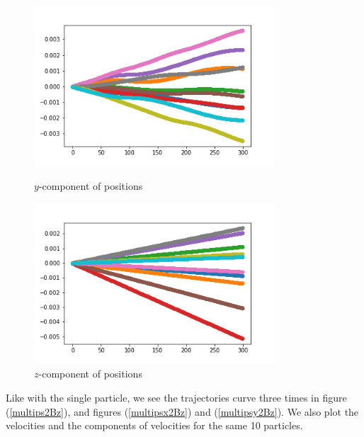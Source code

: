 \documentclass[12pt]{article}
\begin{document}
	\begin{figure}[H]
		\begin{multicols}{2}
			\includegraphics[width=\linewidth, height=6cm]{multipsy2Bz.png} \caption{$y$-component of positions} \label{multipsy2Bz} \par
			\includegraphics[width=\linewidth, height=6cm]{multipsz2Bz.png} \caption{$z$-component of positions} \label{multipsz2Bz} \par
		\end{multicols}
	\end{figure}
	\noindent Like with the single particle, we see the trajectories curve three times in figure (\ref{multips2Bz}), and figures (\ref{multipsx2Bz}) and (\ref{multipsy2Bz}). We also plot the velocities and the components of velocities for the same 10 particles.
\end{document}
